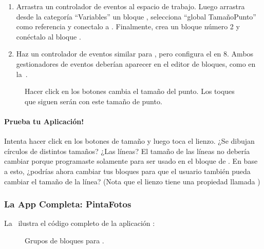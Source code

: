 \begin{enumerate}

\item Arrastra un controlador de eventos 
    al espacio de trabajo. Luego arrastra desde la categoría
    ``Variables'' un bloque , selecciona ``global
    TamañoPunto'' como referencia y conectalo a
    . Finalmente, crea un bloque número 2 y
    conéctalo al bloque .

\item Haz un controlador de eventos similar para
  , pero configura el  en 8. Ambos gestionadores de eventos
  deberían aparecer en el editor de bloques, como en la~.

\end{enumerate}

\begin{figure}[H]
\centering
\caption{Hacer click en los botones cambia el tamaño del
punto. Los toques que siguen serán con este tamaño de punto.}
\label{fig:PaintPot17}
\end{figure}

\paragraph{Prueba tu Aplicación!} Intenta hacer click en los botones
de tamaño y luego toca el lienzo. ¿Se dibujan círculos de distintos
tamaños? ¿Las líneas? El tamaño de las líneas no debería cambiar
porque programaste  solamente para ser usado en
el bloque de . En base a esto, ¿podrías ahora
cambiar tus bloques para que el usuario también pueda cambiar el
tamaño de la línea? (Nota que el lienzo tiene una propiedad llamada
)

\subsubsection*{La App Completa: PintaFotos}

La~ ilustra el código completo de la aplicación :

\begin{figure}[H]
\centering
\caption{Grupos de bloques para .}
\label{fig:PaintPot18}
\end{figure}

